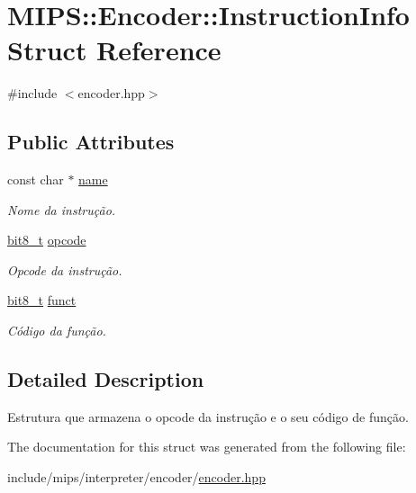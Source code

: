 \hypertarget{structMIPS_1_1Encoder_1_1InstructionInfo}{}\section{M\+I\+PS\+:\+:Encoder\+:\+:Instruction\+Info Struct Reference}
\label{structMIPS_1_1Encoder_1_1InstructionInfo}


{\ttfamily \#include $<$encoder.\+hpp$>$}

\subsection*{Public Attributes}
\begin{DoxyCompactItemize}
\item 
const char $\ast$ \hyperlink{structMIPS_1_1Encoder_1_1InstructionInfo_a5a154469fbf2e7849d39de4cd3b5f11d}{name}\hypertarget{structMIPS_1_1Encoder_1_1InstructionInfo_a5a154469fbf2e7849d39de4cd3b5f11d}{}\label{structMIPS_1_1Encoder_1_1InstructionInfo_a5a154469fbf2e7849d39de4cd3b5f11d}

\begin{DoxyCompactList}\small\item\em Nome da instrução. \end{DoxyCompactList}\item 
\hyperlink{core_8hpp_a6074bae122ae7b527864eec42c728c3c}{bit8\+\_\+t} \hyperlink{structMIPS_1_1Encoder_1_1InstructionInfo_ad6402305f89494fb2ba5a2c23c8ad759}{opcode}\hypertarget{structMIPS_1_1Encoder_1_1InstructionInfo_ad6402305f89494fb2ba5a2c23c8ad759}{}\label{structMIPS_1_1Encoder_1_1InstructionInfo_ad6402305f89494fb2ba5a2c23c8ad759}

\begin{DoxyCompactList}\small\item\em Opcode da instrução. \end{DoxyCompactList}\item 
\hyperlink{core_8hpp_a6074bae122ae7b527864eec42c728c3c}{bit8\+\_\+t} \hyperlink{structMIPS_1_1Encoder_1_1InstructionInfo_a6da2c0420bb34618ad2adf5ad9431e75}{funct}\hypertarget{structMIPS_1_1Encoder_1_1InstructionInfo_a6da2c0420bb34618ad2adf5ad9431e75}{}\label{structMIPS_1_1Encoder_1_1InstructionInfo_a6da2c0420bb34618ad2adf5ad9431e75}

\begin{DoxyCompactList}\small\item\em Código da função. \end{DoxyCompactList}\end{DoxyCompactItemize}


\subsection{Detailed Description}
Estrutura que armazena o opcode da instrução e o seu código de função. 

The documentation for this struct was generated from the following file\+:\begin{DoxyCompactItemize}
\item 
include/mips/interpreter/encoder/\hyperlink{encoder_8hpp}{encoder.\+hpp}\end{DoxyCompactItemize}
